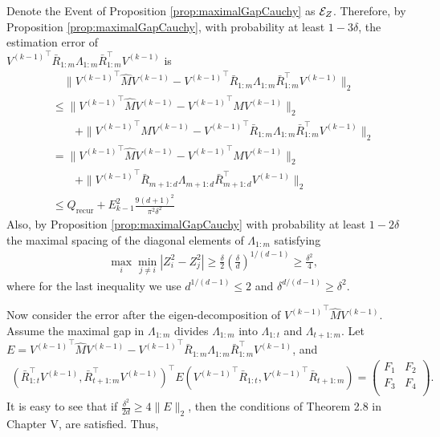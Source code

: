 Denote the Event of Proposition \ref{prop:maximalGapCauchy} as $\mathcal{E}_{Z}$.
Therefore, by Proposition \ref{prop:maximalGapCauchy}, with probability at least $1-3\delta$, 
the estimation error of \\ ${V^{(k-1)}}^\top\bar{R}_{1:m}\Lambda_{1:m} \bar{R}_{1:m}^{\top} V^{(k-1)}$ is 
\begin{align*}
& \quad \| {V^{(k-1)}}^\top \hat{M}V^{(k-1)} - {V^{(k-1)}}^\top\bar{R}_{1:m}\Lambda_{1:m} \bar{R}_{1:m}^{\top} V^{(k-1)} \|_2 \\
& \le \|{V^{(k-1)}}^\top \hat{M}V^{(k-1)} - {V^{(k-1)}}^\top MV^{(k-1)}\|_2 \\
& \qquad + \| {V^{(k-1)}}^\top MV^{(k-1)} -{V^{(k-1)}}^\top\bar{R}_{1:m}\Lambda_{1:m} \bar{R}_{1:m}^{\top} V^{(k-1)} \|_2 \\
&  = \|{V^{(k-1)}}^\top \hat{M}V^{(k-1)} - {V^{(k-1)}}^\top MV^{(k-1)}\|_2 \\
& \qquad + \|{V^{(k-1)}}^\top\bar{R}_{m+1:d}\Lambda_{m+1:d}\bar{R}_{m+1:d}^{\top} V^{(k-1)} \|_2 \\
& \le Q_{\text{recur}} + E_{k-1}^2 \frac{9(d+1)^2}{\pi^2\delta^2} 
\end{align*}
Also, by Proposition \ref{prop:maximalGapCauchy} with probability at least $1-2\delta$ the maximal spacing of the diagonal elements of $\Lambda_{1:m}$ satisfying
\begin{align*}
& \max_i\min_{j\neq i} |Z_i^2 - Z_j^2| \ge \frac{\delta}{2}\left(\frac{\delta}{d}\right)^{1/(d-1)}\ge \frac{\delta^2}{4},
\end{align*}
where for the last inequality we use $d^{1/(d-1)} \le 2$ and $\delta^{d/(d-1)} \ge \delta^2$.

Now consider the error after the eigen-decomposition of ${V^{(k-1)}}^\top \hat{M}V^{(k-1)}$. Assume the maximal gap in $\Lambda_{1:m}$ divides $\Lambda_{1:m}$ into $\Lambda_{1:t}$ and $\Lambda_{t+1:m}$.
Let $E ={V^{(k-1)}}^\top \hat{M}V^{(k-1)} - {V^{(k-1)}}^\top\bar{R}_{1:m}\Lambda_{1:m} \bar{R}_{1:m}^{\top} V^{(k-1)}$, and 
\begin{align*}
( \bar{R}_{1:t}^\top V^{(k-1)}, \bar{R}_{t+1:m}^\top V^{(k-1)})^{\top} E ( {V^{(k-1)}}^\top \bar{R}_{1:t},  {V^{(k-1)}}^\top\bar{R}_{t+1:m})
=
\left(
\begin{array}{cc}
F_{1} & F_{2}\\
F_{3} & F_{4} \\
\end{array} 
\right).
\end{align*}
It is easy to see that if $\frac{\delta^2}{2d} \ge 4\|E\|_2 $, then the conditions of Theorem 2.8 in Chapter V, \citep{stewart1990matrix} are satisfied. Thus,

